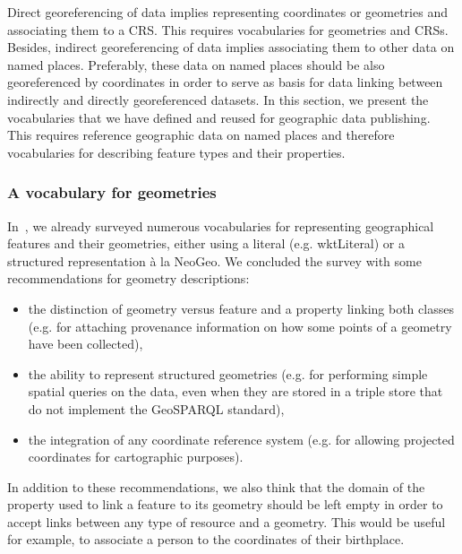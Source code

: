 Direct georeferencing of data implies representing coordinates or geometries and associating them to a CRS.  This requires vocabularies for geometries and CRSs. Besides, indirect georeferencing of data implies associating them to other data on named places. Preferably, these data on named places should be also georeferenced by coordinates in order to serve as basis for data linking between indirectly and directly georeferenced datasets. In this section, we present the vocabularies that we have defined and reused for geographic data publishing.
This requires reference geographic data on named places and therefore vocabularies for describing feature types and their properties. 

\subsubsection{A vocabulary for geometries} \label{sec:geomvocab}
In~\cite{Atemezing:TC12}, we already surveyed numerous vocabularies for representing geographical features and their geometries, either using a literal (e.g. wktLiteral) or a structured representation \`a la NeoGeo. We concluded the survey with some recommendations for geometry descriptions:
\begin{itemize}
 \item the distinction of geometry versus feature and a property linking both classes (e.g. for attaching provenance information on how some points of a geometry have been collected),
 \item the ability to represent structured geometries (e.g. for performing simple spatial queries on the data, even when they are stored in a triple store that do not implement the GeoSPARQL standard),
 \item the integration of any coordinate reference system  (e.g. for allowing projected coordinates for cartographic purposes).
\end{itemize}
In addition to these recommendations, we also think that the domain of the property used to link a feature to its geometry should be left empty in order to accept links between any type of resource and a geometry. This would be useful for example, to associate a person to the coordinates of their birthplace.


